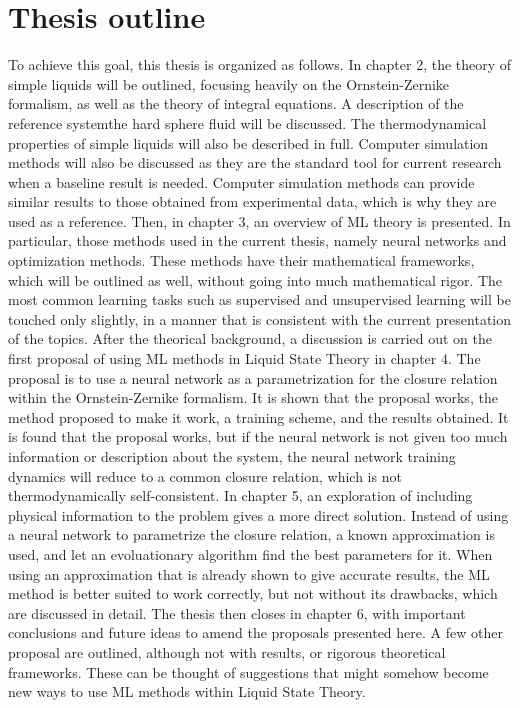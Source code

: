 \section{Thesis outline}
To achieve this goal, this thesis is organized as follows. In chapter 2, 
the theory of simple liquids will be outlined, focusing heavily on the Ornstein-Zernike
formalism, as well as the theory of integral equations.
A description of the reference system\textemdash the hard sphere fluid\textemdash 
will be discussed. The thermodynamical properties of simple liquids will also be described 
in full. Computer simulation methods will also be discussed as they are the standard tool 
for current research when a baseline result is needed. Computer simulation methods can 
provide similar results to those obtained from experimental data, which is why they are 
used as a reference.
Then, in chapter 3, an overview of ML theory is presented.
In particular, those methods used in the current thesis, namely neural networks and
optimization methods. These methods have their mathematical frameworks, which will be
outlined as well, without going into much mathematical rigor.
The most common learning tasks such as supervised and unsupervised learning will be
touched only slightly, in a manner that is consistent with the current presentation
of the topics.
After the theorical background, a discussion is carried out on the first proposal of using 
ML methods in Liquid State Theory in chapter 4.
The proposal is to use a neural network as a 
parametrization for the closure relation within the Ornstein-Zernike formalism.
It is shown that the proposal works, the method proposed to make it work, a training
scheme, and the results obtained. It is found that the proposal works, but if the neural
network is not given too much information or description about the system, the neural
network training dynamics will reduce to a common closure relation, which is not
thermodynamically self-consistent.
In chapter 5, an exploration of including physical information to the problem gives
a more direct solution. Instead of using a neural network to parametrize the closure
relation, a known approximation is used, and let an evoluationary algorithm find the
best parameters for it. When using an approximation that is already shown to give
accurate results, the ML method is better suited to work correctly, but not without
its drawbacks, which are discussed in detail.
The thesis then closes in chapter 6, with important conclusions and future ideas
to amend the proposals presented here. A few other proposal are outlined, although
not with results, or rigorous theoretical frameworks. These can be thought of
suggestions that might somehow become new ways to use ML methods within Liquid
State Theory.